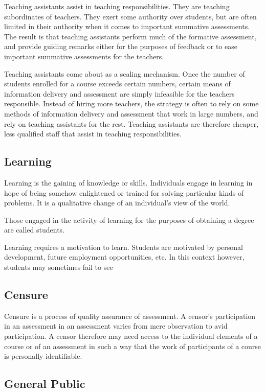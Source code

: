 Teaching assistants assist in teaching responsibilities. They are teaching
subordinates of teachers. They exert some authority over students, but are
often limited in their authority when it comes to important summative
assessments. The result is that teaching assistants perform much of the
formative assessment, and provide guiding remarks either for the purposes of
feedback or to ease important summative assessments for the teachers.

Teaching assistants come about as a scaling mechanism. Once the number of
students enrolled for a course exceeds certain numbers, certain means of
information delivery and assessment are simply infeasible for the teachers
responsible. Instead of hiring more teachers, the strategy is often to rely on
some methods of information delivery and assessment that work in large numbers,
and rely on teaching assistants for the rest. Teaching assistants are therefore
cheaper, less qualified staff that assist in teaching responsibilities.

\subsection{Learning}

Learning is the gaining of knowledge or skills. Individuals engage in learning
in hope of being somehow enlightened or trained for solving particular kinds of
problems. It is a qualitative change of an individual's view of the
world\cite{ramsden-1992}.

Those engaged in the activity of learning for the purposes of obtaining a
degree are called students.

Learning requires a motivation to learn. Students are motivated by personal development, future employment opportunities, etc. In this context however, students may sometimes fail to see 

\subsection{Censure}

Censure is a process of quality assurance of assessment. A censor's
participation in an assessment in an assessment varies from mere observation to
avid participation. A censor therefore may need access to the individual
elements of a course or of an assessment in such a way that the work of
participants of a course is personally identifiable.

\subsection{General Public}

